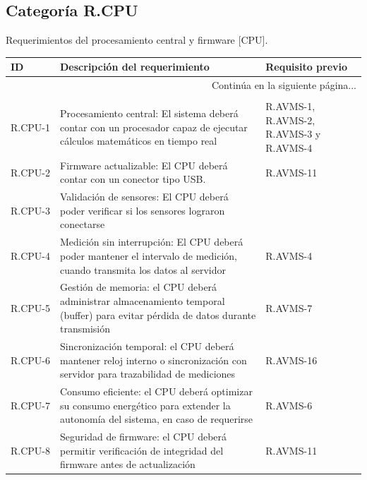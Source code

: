 \documentclass{article}%
\begin{document}
\subsection{Categoría R.CPU}%
\label{subsec:CategoraR.CPU}%
Requerimientos del procesamiento central y firmware [CPU].\newline%
\newline%
%
\begin{longtable}{|p{2cm}|p{9cm}|p{2.5cm}|}%
\hline%
ID&Descripción del requerimiento&Requisito previo\\%
\hline%
\endhead%
\hline%
\multicolumn{3}{|r|}{Continúa en la siguiente página...}\\%
\hline%
\endfoot%
\hline%
\multicolumn{3}{|r|}{Fin de la tabla}\\%
\hline%
\endlastfoot%
R.CPU{-}1& Procesamiento central: El sistema deberá contar con un procesador capaz de ejecutar cálculos matemáticos en tiempo real&R.AVMS{-}1, R.AVMS{-}2, R.AVMS{-}3 y R.AVMS{-}4\\%
\hline%
R.CPU{-}2& Firmware actualizable: El CPU deberá contar con un conector tipo USB.&R.AVMS{-}11\\%
\hline%
R.CPU{-}3& Validación de sensores: El CPU deberá poder verificar si los sensores lograron conectarse& \\%
\hline%
R.CPU{-}4& Medición sin interrupción: El CPU deberá poder mantener el intervalo de medición, cuando transmita los datos al servidor&R.AVMS{-}4\\%
\hline%
R.CPU{-}5& Gestión de memoria: el CPU deberá administrar almacenamiento temporal (buffer) para evitar pérdida de datos durante transmisión& R.AVMS{-}7\\%
\hline%
R.CPU{-}6& Sincronización temporal: el CPU deberá mantener reloj interno o sincronización con servidor para trazabilidad de mediciones& R.AVMS{-}16\\%
\hline%
R.CPU{-}7& Consumo eficiente: el CPU deberá optimizar su consumo energético para extender la autonomía del sistema, en caso de requerirse& R.AVMS{-}6\\%
\hline%
R.CPU{-}8& Seguridad de firmware: el CPU deberá permitir verificación de integridad del firmware antes de actualización& R.AVMS{-}11\\%
\hline%
\end{longtable}

%
\newpage%
\end{document}
